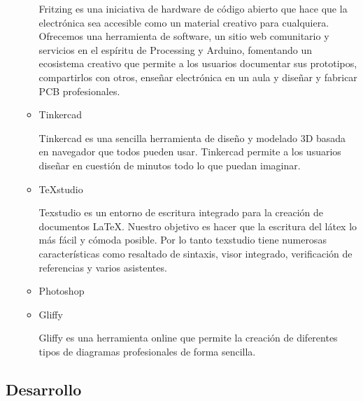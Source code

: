 \documentclass{pclass}
\begin{document}
\begin{itemize}
\begin{itemize}
		Fritzing es una iniciativa de hardware de código abierto que hace que la electrónica sea accesible como un material creativo para cualquiera. Ofrecemos una herramienta de software, un sitio web comunitario y servicios en el espíritu de Processing y Arduino, fomentando un ecosistema creativo que permite a los usuarios documentar sus prototipos, compartirlos con otros, enseñar electrónica en un aula y diseñar y fabricar PCB profesionales.
			\cite{fritzing}
		
		\item Tinkercad
		
		Tinkercad es una sencilla herramienta de diseño y modelado 3D basada en navegador que todos pueden usar. Tinkercad permite a los usuarios diseñar en cuestión de minutos todo lo que puedan imaginar.
			\cite{tinkercad}
			
		\item TeXstudio
		
		Texstudio es un entorno de escritura integrado para la creación de documentos LaTeX. Nuestro objetivo es hacer que la escritura del látex lo más fácil y cómoda posible. Por lo tanto texstudio tiene numerosas características como resaltado de sintaxis, visor integrado, verificación de referencias y varios asistentes.
			\cite{texstudio}
		\item Photoshop
		\item Gliffy
		
		Gliffy es una herramienta online que permite la creación de diferentes tipos de diagramas profesionales de forma sencilla.
			\cite{gliffy}
		
	\end{itemize}
\end{itemize}

 
\subsection{Desarrollo}
\end{document}
